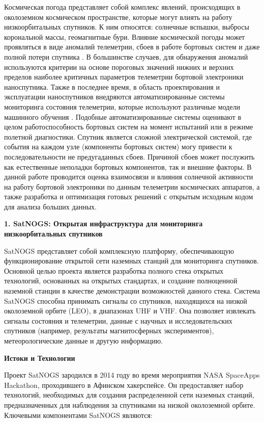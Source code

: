 \documentclass[12pt, a4paper]{extreport}
\begin{document}
Космическая погода представляет собой комплекс явлений, происходящих в околоземном космическом пространстве, которые могут влиять на работу низкоорбитальных спутников. К ним относятся: солнечные вспышки, выбросы корональной массы, геомагнитные бури. Влияние космической погоды может проявляться в виде аномалий телеметрии, сбоев в работе бортовых систем и даже полной потери спутника \cite{green2017impact}. В большинстве случаев, для обнаружения аномалий используются критерии на основе пороговых значений нижних и верхних пределов наиболее критичных параметров телеметрии бортовой электроники наноспутника. Также в последнее время, в область проектирования и эксплуатации наноспутников внедряются автоматизированные системы мониторинга состояния телеметрии, которые используют различные модели машинного обучения \cite{schlag2018numerical}. Подобные автоматизированные системы оценивают в целом работоспособность бортовых систем на момент испытаний или в режиме полетной диагностики. Спутник является сложной электрической системой, где события на каждом узле (компоненты бортовых систем) могу привести к последовательности не предугаданных сбоев. Причиной сбоев может послужить как естественные неполадки бортовых компонентов, так и внешние факторы.  В данной работе проводится оценка взаимосвязи и влияния солнечной активности на работу бортовой электроники по данным телеметрии космических аппаратов, а также разработка и оптимизация готовых решений с открытым исходным кодом для анализа больших данных.

\newpage

{\Large \textbf {1. SatNOGS: Открытая инфраструктура для мониторинга низкоорбитальных спутников}}

SatNOGS представляет собой комплексную платформу, обеспечивающую функционирование открытой сети наземных станций для мониторинга спутников. Основной целью проекта является разработка полного стека открытых технологий, основанных на открытых стандартах, и создание полноценной наземной станции в качестве демонстрации возможностей данного стека. Система SatNOGS способна принимать сигналы со спутников, находящихся на низкой околоземной орбите (LEO), в диапазонах UHF и VHF. Она позволяет извлекать сигналы состояния и телеметрии, данные с научных и исследовательских спутников (например, результаты магнитосферных экспериментов), метеорологические данные и другую информацию.

\textbf{Истоки и Технологии}

Проект SatNOGS зародился в 2014 году во время мероприятия NASA SpaceApps Hackathon, проходившего в Афинском хакерспейсе. Он предоставляет набор технологий, необходимых для создания распределенной сети наземных станций, предназначенных для наблюдения за спутниками на низкой околоземной орбите.
Ключевыми компонентами SatNOGS являются:
\end{document}
